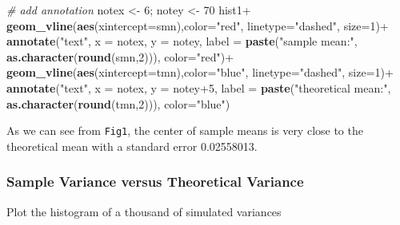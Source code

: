 \documentclass[]{article}
\newenvironment{Shaded}{\begin{snugshade}}{\end{snugshade}}
\newcommand{\KeywordTok}[1]{\textcolor[rgb]{0.13,0.29,0.53}{\textbf{{#1}}}}
\newcommand{\DataTypeTok}[1]{\textcolor[rgb]{0.13,0.29,0.53}{{#1}}}
\newcommand{\DecValTok}[1]{\textcolor[rgb]{0.00,0.00,0.81}{{#1}}}
\newcommand{\StringTok}[1]{\textcolor[rgb]{0.31,0.60,0.02}{{#1}}}
\newcommand{\CommentTok}[1]{\textcolor[rgb]{0.56,0.35,0.01}{\textit{{#1}}}}
\newcommand{\NormalTok}[1]{{#1}}
\begin{document}
\begin{Shaded}
\begin{Highlighting}[]
\CommentTok{# add annotation }
\NormalTok{notex <-}\StringTok{ }\DecValTok{6}\NormalTok{; notey <-}\StringTok{ }\DecValTok{70}
\NormalTok{hist1+}\StringTok{ }\KeywordTok{geom_vline}\NormalTok{(}\KeywordTok{aes}\NormalTok{(}\DataTypeTok{xintercept=}\NormalTok{smn),}\DataTypeTok{color=}\StringTok{"red"}\NormalTok{, }\DataTypeTok{linetype=}\StringTok{"dashed"}\NormalTok{, }\DataTypeTok{size=}\DecValTok{1}\NormalTok{)+}
\StringTok{        }\KeywordTok{annotate}\NormalTok{(}\StringTok{"text"}\NormalTok{, }\DataTypeTok{x =} \NormalTok{notex, }\DataTypeTok{y =} \NormalTok{notey, }
                 \DataTypeTok{label =} \KeywordTok{paste}\NormalTok{(}\StringTok{"sample mean:"}\NormalTok{, }\KeywordTok{as.character}\NormalTok{(}\KeywordTok{round}\NormalTok{(smn,}\DecValTok{2}\NormalTok{))), }\DataTypeTok{color=}\StringTok{"red"}\NormalTok{)+}
\StringTok{        }\KeywordTok{geom_vline}\NormalTok{(}\KeywordTok{aes}\NormalTok{(}\DataTypeTok{xintercept=}\NormalTok{tmn),}\DataTypeTok{color=}\StringTok{"blue"}\NormalTok{, }\DataTypeTok{linetype=}\StringTok{"dashed"}\NormalTok{, }\DataTypeTok{size=}\DecValTok{1}\NormalTok{)+}
\StringTok{        }\KeywordTok{annotate}\NormalTok{(}\StringTok{"text"}\NormalTok{, }\DataTypeTok{x =} \NormalTok{notex, }\DataTypeTok{y =} \NormalTok{notey}\DecValTok{+5}\NormalTok{, }
                 \DataTypeTok{label =} \KeywordTok{paste}\NormalTok{(}\StringTok{"theoretical mean:"}\NormalTok{,  }\KeywordTok{as.character}\NormalTok{(}\KeywordTok{round}\NormalTok{(tmn,}\DecValTok{2}\NormalTok{))), }\DataTypeTok{color=}\StringTok{"blue"}\NormalTok{)}
\end{Highlighting}
\end{Shaded}

As we can see from \texttt{Fig1}, the center of sample means is very
close to the theoretical mean with a standard error 0.02558013.

\subsubsection{Sample Variance versus Theoretical
Variance}\label{sample-variance-versus-theoretical-variance}

Plot the histogram of a thousand of simulated variances
\end{document}
